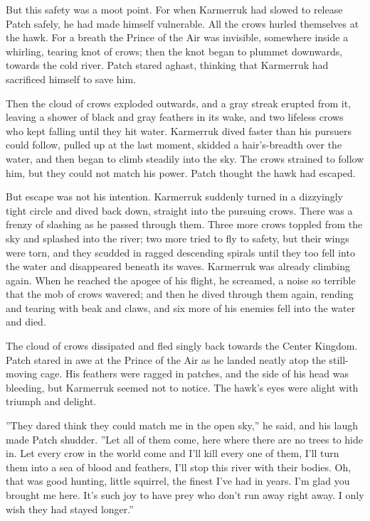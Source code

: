\documentclass[12pt]{book}
\begin{document}
But this safety was a moot point. For when Karmerruk had slowed to release Patch safely, he had made himself vulnerable. All the crows hurled themselves at the hawk. For a breath the Prince of the Air was invisible, somewhere inside a whirling, tearing knot of crows; then the knot began to plummet downwards, towards the cold river. Patch stared aghast, thinking that Karmerruk had sacrificed himself to save him.

Then the cloud of crows exploded outwards, and a gray streak erupted from it, leaving a shower of black and gray feathers in its wake, and two lifeless crows who kept falling until they hit water. Karmerruk dived faster than his pursuers could follow, pulled up at the last moment, skidded a hair's-breadth over the water, and then began to climb steadily into the sky. The crows strained to follow him, but they could not match his power. Patch thought the hawk had escaped.

But escape was not his intention. Karmerruk suddenly turned in a dizzyingly tight circle and dived back down, straight into the pursuing crows. There was a frenzy of slashing as he passed through them. Three more crows toppled from the sky and splashed into the river; two more tried to fly to safety, but their wings were torn, and they scudded in ragged descending spirals until they too fell into the water and disappeared beneath its waves. Karmerruk was already climbing again. When he reached the apogee of his flight, he screamed, a noise so terrible that the mob of crows wavered; and then he dived through them again, rending and tearing with beak and claws, and six more of his enemies fell into the water and died. 

The cloud of crows dissipated and fled singly back towards the Center Kingdom. Patch stared in awe at the Prince of the Air as he landed neatly atop the still-moving cage. His feathers were ragged in patches, and the side of his head was bleeding, but Karmerruk seemed not to notice. The hawk's eyes were alight with triumph and delight.

''They dared think they could match me in the open sky,'' he said, and his laugh made Patch shudder. ''Let all of them come, here where there are no trees to hide in. Let every crow in the world come and I'll kill every one of them, I'll turn them into a sea of blood and feathers, I'll stop this river with their bodies. Oh, that was good hunting, little squirrel, the finest I've had in years. I'm glad you brought me here. It's such joy to have prey who don't run away right away. I only wish they had stayed longer.''
\end{document}
